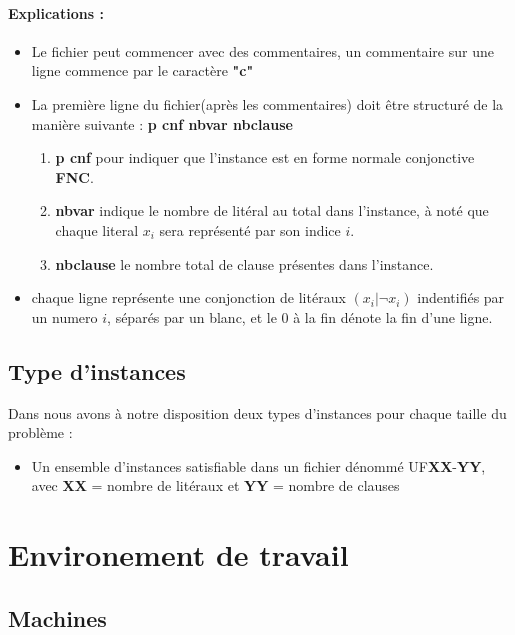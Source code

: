 \paragraph{Explications :}
\begin{itemize}
	\item Le fichier peut commencer avec des commentaires, un commentaire sur une ligne commence par le caractère \textbf{"c"}
	\item La première ligne du fichier(après les commentaires) doit être structuré de la manière suivante : \textbf{p cnf nbvar nbclause}
	\begin{enumerate}
		\item \textbf{p cnf} pour indiquer que l'instance est en forme normale conjonctive \textbf{FNC}.
		\item \textbf{nbvar} indique le nombre de litéral au total dans l'instance, à noté que chaque literal $x_{i}$ sera représenté par son indice $i$.
		\item \textbf{nbclause} le nombre total de clause présentes dans l'instance.
	\end{enumerate}
	\item chaque ligne représente une conjonction de litéraux $(x_{i} \vert \lnot x_{i})$ indentifiés par un numero $i$, séparés par un blanc, et le 0 à la fin dénote la fin d'une ligne.
\end{itemize}
\subsection{Type d'instances}
Dans \cite{Benchmark} nous avons à notre disposition deux types d'instances pour chaque taille du problème : \\
\begin{itemize}
	\item Un ensemble d'instances satisfiable dans un fichier dénommé UF\textbf{XX}-\textbf{YY},\\avec \textbf{XX} = nombre de litéraux et \textbf{YY} = nombre de clauses
\end{itemize}
\section{Environement de travail}
\subsection{Machines}
